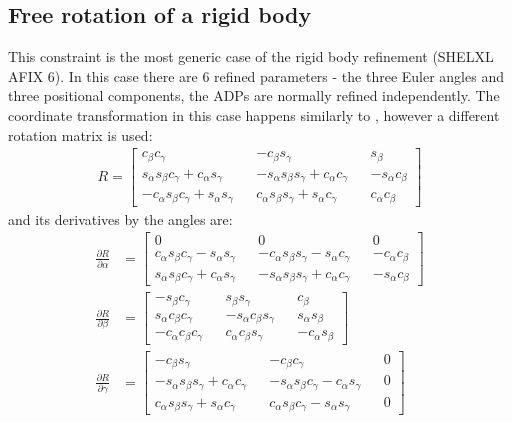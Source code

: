 \documentclass[pdf]{iucr}
\newcommand{\partialder}[2]{\frac{\partial #1}{\partial #2}}
\begin{document}
\subsection{Free rotation of a rigid body}
\label{sec:free:rotated:group}
This constraint is the most generic case of the rigid body refinement (SHELXL AFIX 6). In this case there are 6 refined parameters - the three Euler angles and three positional components, the ADPs are normally refined independently. The coordinate transformation in this case happens similarly to , however a different rotation matrix is used:
\begin{align}
R = \begin{bmatrix} \label{eq:erm}
   c_\beta c_\gamma && - c_\beta s_\gamma &&  s_\beta \\
   s_\alpha s_\beta c_\gamma +  c_\alpha s_\gamma && - s_\alpha s_\beta s_\gamma+ c_\alpha c_\gamma && - s_\alpha c_\beta \\
  - c_\alpha s_\beta c_\gamma+ s_\alpha s_\gamma &&  c_\alpha s_\beta s_\gamma+ s_\alpha c_\gamma &&  c_\alpha c_\beta
\end{bmatrix}
\end{align}
and its derivatives by the angles are:
\begin{align}
\partialder{R}{\alpha} &= \begin{bmatrix}
  0 && 0 && 0 \\
   c_\alpha s_\beta c_\gamma -  s_\alpha s_\gamma && - c_\alpha s_\beta s_\gamma- s_\alpha c_\gamma && - c_\alpha c_\beta \\
   s_\alpha s_\beta c_\gamma+ c_\alpha s_\gamma && - s_\alpha s_\beta s_\gamma+ c_\alpha c_\gamma && - s_\alpha c_\beta
\end{bmatrix}
\\
\partialder{R}{\beta} &= \begin{bmatrix}
  - s_\beta c_\gamma &&  s_\beta s_\gamma &&  c_\beta \\
   s_\alpha c_\beta c_\gamma && - s_\alpha c_\beta s_\gamma &&  s_\alpha s_\beta \\
  - c_\alpha c_\beta c_\gamma &&  c_\alpha c_\beta s_\gamma && - c_\alpha s_\beta
\end{bmatrix}
\\
\partialder{R}{\gamma} &= \begin{bmatrix}
  - c_\beta s_\gamma && - c_\beta c_\gamma && 0 \\
  - s_\alpha s_\beta s_\gamma +  c_\alpha c_\gamma && - s_\alpha s_\beta c_\gamma- c_\alpha s_\gamma && 0 \\
   c_\alpha s_\beta s_\gamma+ s_\alpha c_\gamma &&  c_\alpha s_\beta c_\gamma- s_\alpha s_\gamma && 0
\end{bmatrix}
\end{align}
\end{document}
